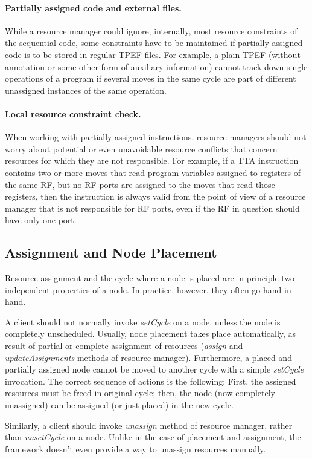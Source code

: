\documentclass[a4paper,twoside]{tce}
\begin{document}
\paragraph{Partially assigned code and external files.}
While a resource manager could ignore, internally, most resource constraints
of the sequential code, some constraints have to be maintained if partially
assigned code is to be stored in regular TPEF files. For example, a plain
TPEF (without annotation or some other form of auxiliary information) cannot
track down single operations of a program if several moves in the same cycle
are part of different unassigned instances of the same operation.

\paragraph{Local resource constraint check.}
When working with partially assigned instructions, resource managers should
not worry about potential or even unavoidable resource conflicts that
concern resources for which they are not responsible.
%
For example, if a TTA instruction contains two or more moves that read
program variables assigned to registers of the same RF, but no RF ports are
assigned to the moves that read those registers, then the instruction is
always valid from the point of view of a resource manager that is not
responsible for RF ports, even if the RF in question should have only one
port.

\subsection{Assignment and Node Placement}
Resource assignment and the cycle where a node is placed are in principle
two independent properties of a node. In practice, however, they often go
hand in hand.

A client should not normally invoke \emph{setCycle} on a node, unless the
node is completely unscheduled. Usually, node placement takes place
automatically, as result of partial or complete assignment of resources
(\emph{assign} and \emph{updateAssignments} methods of resource manager).
%
Furthermore, a placed and partially assigned node cannot be moved to another
cycle with a simple \emph{setCycle} invocation. The correct sequence of
actions is the following: First, the assigned resources must be freed in
original cycle; then, the node (now completely unassigned) can be assigned
(or just placed) in the new cycle.

Similarly, a client should invoke \emph{unassign} method of resource
manager, rather than \emph{unsetCycle} on a node. Unlike in the case of
placement and assignment, the framework doesn't even provide a way to
unassign resources manually.
\end{document}
